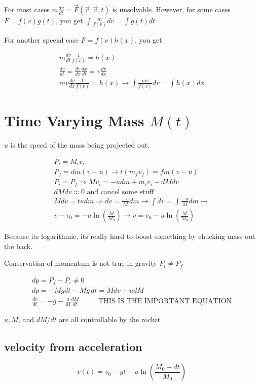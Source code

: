 \documentclass[fleqn]{report}
\newcommand{\hp}{\hspace{1cm}}
\newcommand{\equations} [1] {
\begin{gather*}
#1
\end{gather*}
}
\begin{document}
For most cases $m \frac{dv}{dt} = \vec F(\vec r, \vec v, t)$ is 
unsolvable. However, for some cases
$F = f(v) g(t)$, you get
$\int \frac{m}{f(v)} dv = \int g(t) dt$

For another special case $F = f(v) h(x)$, you get
\equations{
    m \frac{dv}{dt} \frac{1}{f(v)} = h(x) 
    \\
    \frac{dv}{dt} = \frac{dv}{dx} \frac{dx}{dt} = v \frac{dv}{dx}
    \\
    m v \frac{dv}{dx} \frac{1}{f(v)} = h(x)
    \rightarrow
    \int \frac{mv}{f(v)} dv = \int h(x) dx 
}

\section{Time Varying Mass $M(t)$}
$u$ is the speed of the mass being projected out.
\equations{
    P_i = M_i v_i
    \\
    P_f = dm(v - u)
    \rightarrow
    t(m_f v_f)
    =
    fm(v - u)
    \\
    P_i = P_f \Rightarrow Mv_i = -u dm + m_i v_i - dM dv 
    \\
    dM dv \approx 0 \textrm{ and cancel some stuff}
    \\
    Mdv = t u dm
    \Longrightarrow
    dv = \frac{-u}{M} dm
    \rightarrow
    \int dv = \int \frac{-u}{M} dm
    \rightarrow 
    \\
    v - v_0 = -u \ln(\frac{M}{M_0})
    \rightarrow
    v = v_0 - u \ln(\frac{M}{M_0})
}
Because its logarithmic, its really hard to boost something by 
chucking mass out the back.

Conservation of momentum is not true in gravity 
$P_i \neq P_f$

\equations{
    dp = P_f - P_i \neq 0
    \\
    dp = -Mg dt 
    -Mg \, dt = M dv + u dM 
    \\
    \frac{dv}{dt} = -g - \frac{u}{M} \frac{dM}{dt}
    \hp 
    \textrm{ THIS IS THE IMPORTANT EQUATION}
}
$u, M$, and $dM/dt$ are all controllable by the rocket

\subsection{velocity from acceleration}
\[
v(t) = v_0 -gt - u \ln(\frac{M_0 - dt}{M_0})
\]
\end{document}
